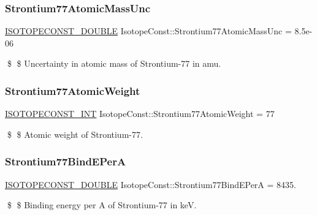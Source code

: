 \subsubsection{\texorpdfstring{Strontium77\+Atomic\+Mass\+Unc}{Strontium77AtomicMassUnc}}
{\footnotesize\ttfamily \mbox{\hyperlink{group___isotope_const-_macros_ga8f45a7272ce02c0b4c65c44636ed719a}{I\+S\+O\+T\+O\+P\+E\+C\+O\+N\+S\+T\+\_\+\+D\+O\+U\+B\+LE}} Isotope\+Const\+::\+Strontium77\+Atomic\+Mass\+Unc = 8.\+5e-\/06}

\$ \$ Uncertainty in atomic mass of Strontium-\/77 in amu. \mbox{\label{group___isotope_const-_strontium-_sr77_gaa3213026ffcc31fc3fc2fd66a7fef800}} 
\subsubsection{\texorpdfstring{Strontium77\+Atomic\+Weight}{Strontium77AtomicWeight}}
{\footnotesize\ttfamily \mbox{\hyperlink{group___isotope_const-_macros_ga5f18360b3e99483a35c32d789e62621c}{I\+S\+O\+T\+O\+P\+E\+C\+O\+N\+S\+T\+\_\+\+I\+NT}} Isotope\+Const\+::\+Strontium77\+Atomic\+Weight = 77}

\$ \$ Atomic weight of Strontium-\/77. \mbox{\label{group___isotope_const-_strontium-_sr77_ga5d24d26fa961e0cc1d60a00052ce170d}} 
\subsubsection{\texorpdfstring{Strontium77\+Bind\+E\+PerA}{Strontium77BindEPerA}}
{\footnotesize\ttfamily \mbox{\hyperlink{group___isotope_const-_macros_ga8f45a7272ce02c0b4c65c44636ed719a}{I\+S\+O\+T\+O\+P\+E\+C\+O\+N\+S\+T\+\_\+\+D\+O\+U\+B\+LE}} Isotope\+Const\+::\+Strontium77\+Bind\+E\+PerA = 8435.}

\$ \$ Binding energy per A of Strontium-\/77 in keV. \mbox{\label{group___isotope_const-_strontium-_sr77_ga6baf69eccbaf10c41761f13aed07cee5}} 
